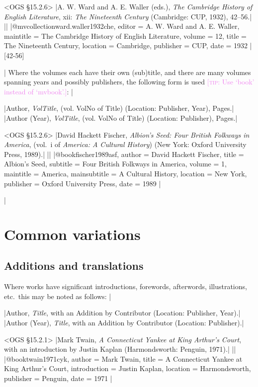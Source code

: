 \documentclass[extrafontsizes,11pt,a4paper,oneside]{memoir}
\newcommand*{\lit}[1]{\textsf{#1}}
\newcommand*{\code}[1]{`\textsf{#1}'}
\newcommand*{\aside}[1]{\textcolor{violet}{[\textsc{tip:} #1]}}
\begin{document}
\bibexample<OGS \S15.2.6>
|A. W. Ward and A. E. Waller (eds.), \emph{The Cambridge History of English Literature}, xii: \emph{The Nineteenth Century} (Cambridge: CUP, 1932), 42--56.|%
||%
|@mvcollection{ward.waller1932che,
  editor = {A. W. Ward and A. E. Waller},
  maintitle = {The Cambridge History of English Literature},
  volume = {12},
  title = {The Nineteenth Century},
  location = {Cambridge},
  publisher = {CUP},
  date = {1932}
}|[42-56]

\todoc|
Where the volumes each have their own (sub)title,
and there are many volumes spanning years and possibly publishers,
the following form is used \aside{Use \code{book} instead of \code{mvbook}.}:
|

\specs
|Author, \emph{VolTitle}, (\lit{vol.} VolNo \lit{of} Title) (Location: Publisher, Year), Pages.|%
|Author (Year), \emph{VolTitle}, (\lit{vol.} VolNo \lit{of} Title) (Location: Publisher), Pages.|

\bibexample<OGS \S15.2.6>
|David Hackett Fischer, \emph{Albion’s Seed: Four British Folkways in America}, (vol.\ i of \emph{America: A Cultural History}) (New York: Oxford University Press, 1989).|%
||%
|@book{fischer1989asf,
  author = {David Hackett Fischer},
  title = {Albion’s Seed},
  subtitle = {Four British Folkways in America},
  volume = {1},
  maintitle = {America},
  mainsubtitle = {A Cultural History},
  location = {New York},
  publisher = {Oxford University Press},
  date = {1989}
}|

\todoc|
\section{Common variations}

\subsection{Additions and translations}

Where works have significant introductions, forewords, afterwords, illustrations, etc.\ this may be noted as follows:
|

\specs
|Author, \emph{Title}, \lit{with an} Addition \lit{by} Contributor (Location: Publisher, Year).|%
|Author (Year), \emph{Title}, \lit{with an} Addition \lit{by} Contributor (Location: Publisher).|

\bibexample<OGS \S15.2.1>
|Mark Twain, \emph{A Connecticut Yankee at King Arthur's Court}, with an introduction by Justin Kaplan (Harmondsworth: Penguin, 1971).|%
||%
|@book{twain1971cyk,
  author = {Mark Twain},
  title = {A {Connecticut} Yankee at {King} {Arthur's} Court},
  introduction = {Justin Kaplan},
  location = {Harmondsworth},
  publisher = {Penguin},
  date = {1971}
}|
\end{document}
